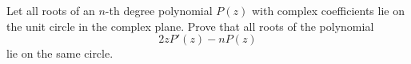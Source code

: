 Let all roots of an \(n\)-th degree polynomial \(P(z)\) with complex coefficients lie on the unit circle in the complex plane. Prove that all roots of the polynomial
\[2zP'(z)-nP(z)\]lie on the same circle.